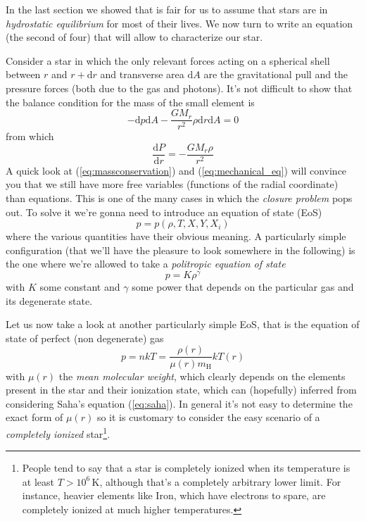 In the last section we showed that is fair for us to assume that stars are in \emph{hydrostatic equilibrium} for most of their lives. We now turn to write an equation (the second of four) that will allow to characterize our star.
\par Consider a star in which the only relevant forces acting on a spherical shell between $r$ and $r+\text{d}r$ and transverse area $\text{d}A$ are the gravitational pull and the pressure forces (both due to the gas and photons). It's not difficult to show that the balance condition for the mass of the small element is
\begin{equation*}
	-\text{d}p\text{d}A -\frac{GM_{r}}{r^{2}}\rho\text{d}r\text{d}A = 0
\end{equation*}
from which 
\begin{equation}
	\boxed{
		\frac{\text{d}P}{\text{d}r} = -\frac{GM_{r}\rho}{r^{2}}
	}
	\label{eq:mechanical_eq}
\end{equation}
A quick look at (\ref{eq:massconservation}) and (\ref{eq:mechanical_eq}) will convince you that we still have more free variables (functions of the radial coordinate) than equations. This is one of the many cases in which the \emph{closure problem} pops out. To solve it we're gonna need to introduce an equation of state (EoS)
\begin{equation}
	\boxed{
		p = p(\rho, T, X, Y, X_{i})
	}
	\label{eq:general_eos}
\end{equation}
where the various quantities have their obvious meaning. A particularly simple configuration (that we'll have the pleasure to look somewhere in the following) is the one where we're allowed to take a \emph{politropic equation of state}
\begin{equation}
	p = K\rho^{\gamma}
	\label{eq:politropic_eos}
\end{equation}
with $K$ some constant and $\gamma$ some power that depends on the particular gas and its degenerate state.
\par Let us now take a look at another particularly simple EoS, that is the equation of state of perfect (non degenerate) gas
\begin{equation}
	p = nkT = \frac{\rho(r)}{\mu(r) m_{\text{H}}}kT(r)
	\label{eq:perfectgas_eos}
\end{equation}
with $\mu(r)$ the \emph{mean molecular weight}, which clearly depends on the elements present in the star and their ionization state, which can (hopefully) inferred from considering Saha's equation (\ref{eq:saha}). In general it's not easy to determine the exact form of $\mu(r)$ so it is customary to consider the easy scenario of a \emph{completely ionized} star\footnote{People tend to say that a star is completely ionized when its temperature is at least $T > 10^{6}\,\text{K}$, although that's a completely arbitrary lower limit. For instance, heavier elements like Iron, which have electrons to spare, are completely ionized at much higher temperatures.}.
